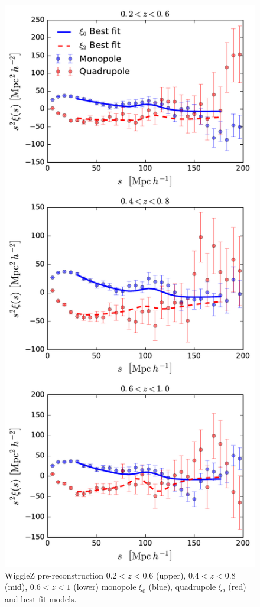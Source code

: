 \documentclass[a4paper,fleqn,usenatbib]{mnras}
\begin{document}
\begin{figure}
	\begin{center}
		\includegraphics[width=\columnwidth]{prerecon_result.pdf}
		\caption{\label{fig:prerecon_result}  WiggleZ pre-reconstruction $0.2<z<0.6$ (upper), $0.4<z<0.8$ (mid), $0.6<z<1$ (lower) monopole $\xi_{0}$ (blue), quadrupole $\xi_{2}$ (red) and best-fit models.%
		}
	\end{center}
\end{figure}
\end{document}
